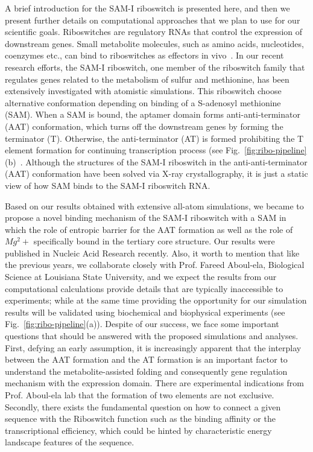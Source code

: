\documentclass[a4paper,10pt]{article}
\begin{document}
A brief introduction for the SAM-I riboswitch is presented here, and then we present further details on computational approaches that we plan to use for our scientific goals.  Riboswitches are regulatory RNAs that control the expression of downstream genes. Small metabolite molecules, such as amino acids, nucleotides, coenzymes etc., can bind to riboswitches as effectors in vivo~\cite{mandal}.  In our recent research efforts, the SAM-I riboswitch, one member of the riboswitch family that regulates genes related to the metabolism of sulfur and methionine, has been extensively investigated with atomistic simulations.  This riboswitch choose alternative conformation depending on binding of a S-adenosyl methionine (SAM).  When a SAM is bound, the aptamer domain forms anti-anti-terminator (AAT) conformation, which turns off the downstream genes by forming the terminator (T). Otherwise, the anti-terminator (AT) is formed prohibiting the T element formation for continuing transcription process (see Fig.~\ref{fig:ribo-pipeline}(b)~\cite{brooke}.  Although the structures of the SAM-I riboswitch in the anti-anti-terminator (AAT) conformation have been solved via X-ray crystallography, it is just a static view of how SAM binds to the SAM-I riboswitch RNA.  

Based on our results obtained with extensive all-atom simulations, we became to propose a novel binding mechanism of the SAM-I riboswitch with a SAM in which the role of entropic barrier for the AAT formation as well as the role of $Mg^2+$ specifically bound in the tertiary core structure.  Our results were published in Nucleic Acid Research recently\cite{SAM-I-NAR2009}.  Also, it worth to mention that like the previous years, we collaborate closely with Prof. Fareed Aboul-ela, Biological Science at Louisiana State University, and we expect the results from our computational calculations provide details that are typically inaccessible to experiments; while at the same time providing the opportunity for our simulation results will be validated using biochemical and biophysical experiments (see Fig.~\ref{fig:ribo-pipeline}(a)).   Despite of our success, we face some important questions that should be answered with the proposed simulations and analyses.  First, defying an early assumption, it is increasingly apparent that the interplay between the AAT formation and the AT formation is an important factor to understand the metabolite-assisted folding and consequently gene regulation mechanism with the expression domain.  There are experimental indications from Prof. Aboul-ela lab that the formation of two elements are not exclusive.  Secondly, there exists the fundamental question on how to connect a given sequence with the Riboswitch function such as the binding affinity or the transcriptional efficiency, which could be hinted by characteristic energy landscape features of the sequence. 
\end{document}
